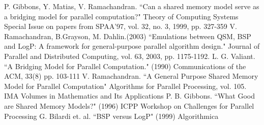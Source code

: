 \documentclass[12pt,a4paper]{article}
\begin{document}
\newpage
\singlespace
\begin{thebibliography}{9}

 P. Gibbons, Y. Matias, V. Ramachandran. ``Can a shared memory model serve as a bridging model for parallel computation?" Theory of Computing Systems Special Issue on papers from SPAA'97, vol. 32, no. 3, 1999, pp. 327-359
 V. Ramachandran, B.Grayson, M. Dahlin.(2003) ``Emulations between QSM, BSP and LogP: A framework for general-purpose parallel algorithm design." Journal of Parallel and Distributed Computing, vol. 63, 2003, pp. 1175-1192. 
 L. G. Valiant. ``A Bridging Model for Parallel Computation." (1990) Communications of the ACM, 33(8) pp. 103-111
 V. Ramachandran. ``A General Purpose Shared Memory Model for Parallel Computation" Algorithms for Parallel Processing, vol. 105. IMA
Volumes in Mathematics and Its Applications
 P. B. Gibbons. ``What Good are Shared Memory Models?" (1996) ICPP Workshop on Challenges for Parallel Processing
 G. Bilardi et. al. ``BSP versus LogP" (1999) Algorithmica 
\end{thebibliography}
\end{document}
